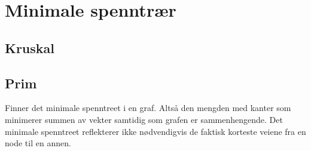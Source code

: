 \section{Minimale spenntrær}
\subsection{Kruskal}
\subsection{Prim}
Finner det minimale spenntreet i en graf. Altså den mengden med kanter som minimerer summen av vekter samtidig som grafen er sammenhengende. Det minimale spenntreet reflekterer ikke nødvendigvis de faktisk korteste veiene fra en node til en annen.
